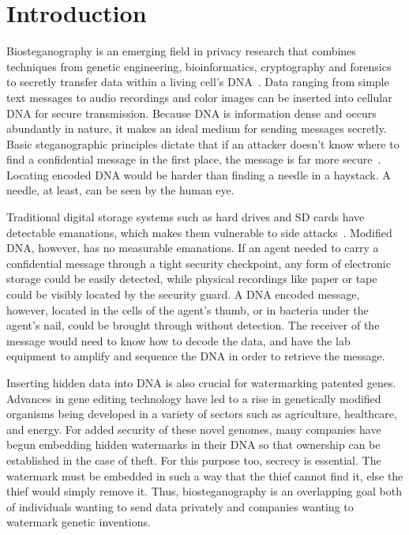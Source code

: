 \documentclass[USenglish,oneside,twocolumn]{article}
\begin{document}


\maketitle
\section{Introduction}

Biosteganography is an emerging field in privacy research that combines techniques from genetic engineering, bioinformatics, cryptography and forensics to secretly transfer data within a living cell's DNA~\cite{B2016JOB}. Data ranging from simple text messages to audio recordings and color images can be inserted into cellular DNA for secure transmission. Because DNA is information dense and occurs abundantly in nature, it makes an ideal medium for sending messages secretly. Basic steganographic principles dictate that if an attacker doesn’t know where to find a confidential message in the first place, the message is far more secure~\cite{A2001IEEEIC}. Locating encoded DNA would be harder than finding a needle in a haystack. A needle, at least, can be seen by the human eye.

Traditional digital storage systems such as hard drives and SD cards have detectable emanations, which makes them vulnerable to side attacks~\cite{T2008TOIAS}. Modified DNA, however, has no measurable emanations. If an agent needed to carry a confidential message through a tight security checkpoint, any form of electronic storage could be easily detected, while physical recordings like paper or tape could be visibly located by the security guard. A DNA encoded message, however, located in the cells of the agent's thumb, or in bacteria under the agent's nail, could be brought through without detection. The receiver of the message would need to know how to decode the data, and have the lab equipment to amplify and sequence the DNA in order to retrieve the message.

Inserting hidden data into DNA is also crucial for watermarking patented genes. Advances in gene editing technology have led to a rise in genetically modified organisms being developed in a variety of sectors such as agriculture, healthcare, and energy. For added security of these novel genomes, many companies have begun embedding hidden watermarks in their DNA so that ownership can be established in the case of theft. For this purpose too, secrecy is essential. The watermark must be embedded in such a way that the thief cannot find it, else the thief would simply remove it. Thus, biosteganography is an overlapping goal both of individuals wanting to send data privately and companies wanting to watermark genetic inventions.
\end{document}
